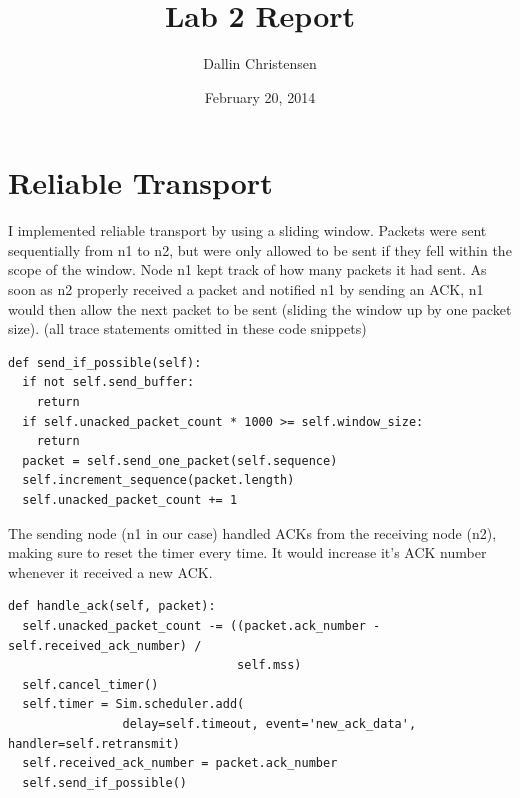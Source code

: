 \documentclass[11pt]{article}
\begin{document}
\lstset{
  language=Python,
  basicstyle=\small,          %
  keywordstyle=\bfseries,
  identifierstyle=,           %
  commentstyle=,              %
  stringstyle=\ttfamily,      %
  showstringspaces=false,     %
  numbers=left,
  numberstyle=\tiny,
  numbersep=5pt,
  frame=tb,
}

\title{Lab 2 Report}

\author{Dallin Christensen}

\date{February 20, 2014}

\maketitle

\section{Reliable Transport}
I implemented reliable transport by using a sliding window. Packets were sent sequentially from n1 to n2, but were only allowed to be sent if they fell within the scope of the window. Node n1 kept track of how many packets it had sent. As soon as n2 properly received a packet and notified n1 by sending an ACK, n1 would then allow the next packet to be sent (sliding the window up by one packet size).
(all trace statements omitted in these code snippets)
\begin{lstlisting}
def send_if_possible(self):
  if not self.send_buffer:
    return
  if self.unacked_packet_count * 1000 >= self.window_size:
    return
  packet = self.send_one_packet(self.sequence)
  self.increment_sequence(packet.length)
  self.unacked_packet_count += 1
\end{lstlisting}

The sending node (n1 in our case) handled ACKs from the receiving node (n2), making sure to reset the timer every time. It would increase it's ACK number whenever it received a new ACK.
\begin{lstlisting}
def handle_ack(self, packet):
  self.unacked_packet_count -= ((packet.ack_number - self.received_ack_number) / 
                                self.mss)
  self.cancel_timer()
  self.timer = Sim.scheduler.add(
                delay=self.timeout, event='new_ack_data', handler=self.retransmit)
  self.received_ack_number = packet.ack_number
  self.send_if_possible()
\end{lstlisting}
\end{document}
